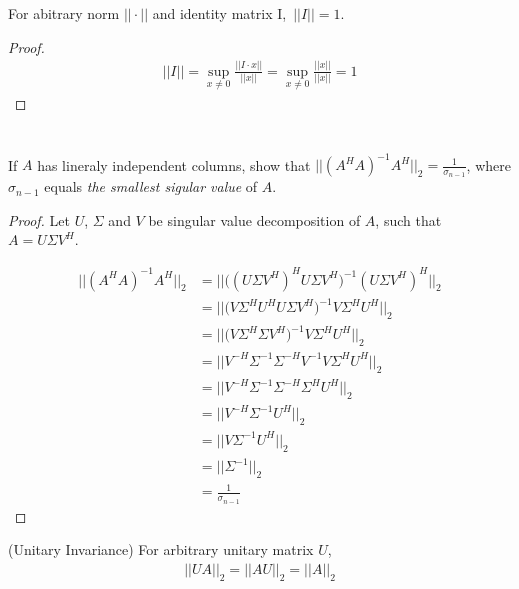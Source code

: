 \documentclass[11pt,a4paper]{article}
\begin{document}
\begin{lemma}
    For abitrary norm $|| \cdot ||$ and identity matrix I,\ $|| I || = 1$.
\end{lemma}
\begin{proof}
    \begin{align}
        || I || = \sup_{x\not =0} \frac{|| I \cdot x ||}{|| x ||} 
        = \sup_{x\not =0} \frac{|| x ||}{|| x ||} 
        = 1
    \end{align}
\end{proof}

\newpage
\section{}
If $A$ has lineraly independent columns, show that 
$|| (A^H A)^{-1} A^H ||_2 = \frac{1}{\sigma_{n-1}}$, where $\sigma_{n-1}$
equals {\it the smallest sigular value} of $A$. 

\begin{proof}
    Let $U$, $\Sigma$ and $V$ be singular value decomposition of $A$, such
    that $A = U\Sigma V^H$.

    \begin{align}
         || (A^H A)^{-1} A^H ||_2 
        &= || \big( (U\Sigma V^H)^H U\Sigma V^H \big)^{-1} (U\Sigma V^H)^H ||_2 \\
        &= || \big( V \Sigma^H U^H U\Sigma V^H \big)^{-1} V \Sigma^H U^H ||_2 \\
        &= || \big( V \Sigma^H \Sigma V^H \big)^{-1} V \Sigma^H U^H ||_2 \\
        &= || V^{-H} \Sigma^{-1} \Sigma^{-H} V^{-1}  V \Sigma^H U^H ||_2 \\
        &= || V^{-H} \Sigma^{-1} \Sigma^{-H} \Sigma^H U^H ||_2 \\
        &= || V^{-H} \Sigma^{-1} U^H ||_2 \\
        &= || V \Sigma^{-1} U^H ||_2 \\
        &= || \Sigma^{-1}||_2 \\
        &= \frac{1}{\sigma_{n-1}}
    \end{align}
\end{proof}

\begin{lemma}
    (Unitary Invariance) For arbitrary unitary matrix $U$, 
    \begin{align}
        || U A ||_2 = || A U ||_2 = || A ||_2 
    \end{align}
\end{lemma}
\end{document}
